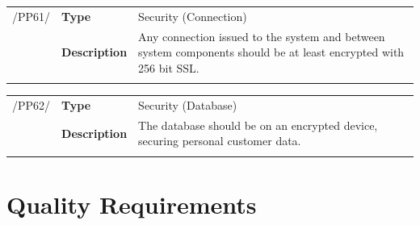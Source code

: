 \documentclass[11pt,a4paper,oneside,svgnames]{report}
\begin{document}
\noindent
\begin{tabular}{llp{8.75cm}}
\cellcolor{white}/PP61/	& \textbf{Type}			& Security (Connection)\\
\cellcolor{white}		& \textbf{Description}	& Any connection issued to the system and between system components should be at least encrypted with 256 bit SSL.\\
\cellcolor{white}		\hfill \\
\end{tabular}

\noindent
\begin{tabular}{llp{8.75cm}}
\cellcolor{white}/PP62/	& \textbf{Type}			& Security (Database)\\
\cellcolor{white}		& \textbf{Description}	& The database should be on an encrypted device, securing personal customer data.\\
\cellcolor{white}		\hfill \\
\end{tabular}

\chapter{Quality Requirements}
\end{document}
